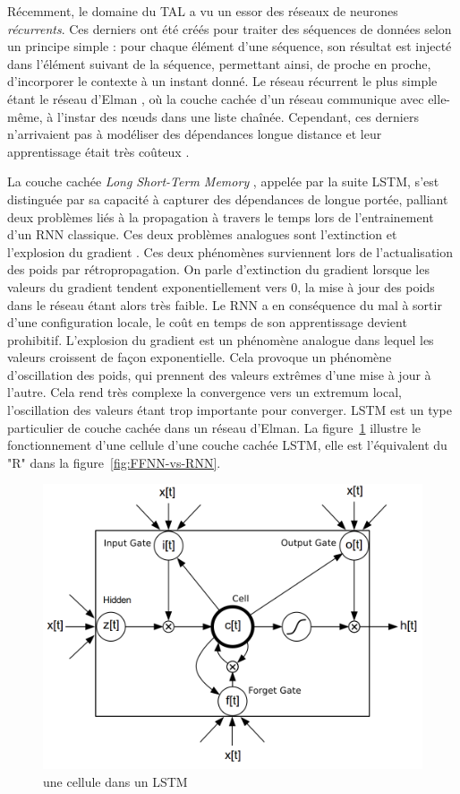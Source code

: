 \documentclass[PhD-Yoann-Dupont.tex]{subfiles}
\begin{document}
Récemment, le domaine du TAL a vu un essor des réseaux de neurones \emph{récurrents}. Ces derniers ont été créés pour traiter des séquences de données selon un principe simple : pour chaque élément d'une séquence, son résultat est injecté dans l'élément suivant de la séquence, permettant ainsi, de proche en proche, d'incorporer le contexte à un instant donné. Le réseau récurrent le plus simple étant le réseau d'Elman \citep{elman1990finding}, où la couche cachée d'un réseau communique avec elle-même, à l'instar des n\oe uds dans une liste chaînée. Cependant, ces derniers n'arrivaient pas à modéliser des dépendances longue distance et leur apprentissage était très coûteux \citep{bengio1994learning}.

La couche cachée \emph{Long Short-Term Memory} \citep{hochreiter1997long}, appelée par la suite LSTM, s'est distinguée par sa capacité à capturer des dépendances de longue portée, palliant deux problèmes liés à la propagation à travers le temps lors de l'entrainement d'un RNN classique. Ces deux problèmes analogues sont l'extinction et l'explosion du gradient \citep{hochreiter1997long}. Ces deux phénomènes surviennent lors de l'actualisation des poids par rétropropagation. On parle d'extinction du gradient lorsque les valeurs du gradient tendent exponentiellement vers 0, la mise à jour des poids dans le réseau étant alors très faible. Le RNN a en conséquence du mal à sortir d'une configuration locale, le coût en temps de son apprentissage devient prohibitif. L'explosion du gradient est un phénomène analogue dans lequel les valeurs croissent de façon exponentielle. Cela provoque un phénomène d'oscillation des poids, qui prennent des valeurs extrêmes d'une mise à jour à l'autre. Cela rend très complexe la convergence vers un extremum local, l'oscillation des valeurs étant trop importante pour converger. LSTM est un type particulier de couche cachée dans un réseau d'Elman. La figure\ \ref{fig:lstm-cell} illustre le fonctionnement d'une cellule d'une couche cachée LSTM, elle est l'équivalent du "R" dans la figure\ \ref{fig:FFNN-vs-RNN}.


\begin{figure}[ht!]
\centering
\includegraphics[scale=0.75]{images/LSTM/LSTM-cell}
\caption{une cellule dans un LSTM}
\label{fig:lstm-cell}
\end{figure}
\end{document}
